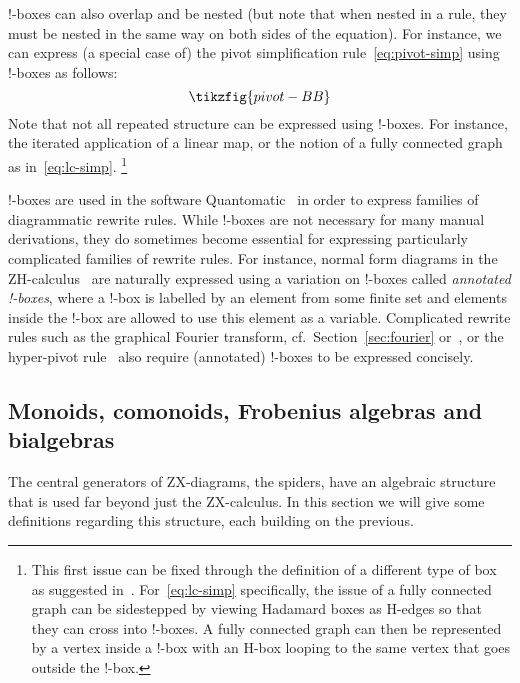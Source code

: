 \documentclass[a4paper,onecolumn,superscriptaddress,11pt,%
				unpublished,%
				allowfontchageintitle,%
				]{quantumarticle}
\begin{document}
!-boxes can also overlap and be nested (but note that when nested in a rule, they must be nested in the same way on both sides of the equation). 
For instance, we can express (a special case of) the pivot simplification rule~\eqref{eq:pivot-simp} using !-boxes as follows:
\begin{equation}
	\tikzfig{pivot-BB}
\end{equation}
Note that not all repeated structure can be expressed using !-boxes. For instance, the iterated application of a linear map, or the notion of a fully connected graph as in~\eqref{eq:lc-simp}.%
\footnote{This first issue can be fixed through the definition of a different type of box as suggested in~\cite{MillerBakewell2020finite}. For~\eqref{eq:lc-simp} specifically, the issue of a fully connected graph can be sidestepped by viewing Hadamard boxes as H-edges so that they can cross into !-boxes. A fully connected graph can then be represented by a vertex inside a !-box with an H-box looping to the same vertex that goes outside the !-box.}

!-boxes are used in the software Quantomatic~\cite{kissinger2015quantomatic} in order to express families of diagrammatic rewrite rules. While !-boxes are not necessary for many manual derivations, they do sometimes become essential for expressing particularly complicated families of rewrite rules. For instance, normal form diagrams in the ZH-calculus~\cite{backens2018zhcalculus} are naturally expressed using a variation on !-boxes called \emph{annotated !-boxes}, where a !-box is labelled by an element from some finite set and elements inside the !-box are allowed to use this element as a variable.
Complicated rewrite rules such as the graphical Fourier transform, cf.~Section~\ref{sec:fourier} or~\cite{GraphicalFourier2019}, or the hyper-pivot rule~\cite{Lemonnier2020hypergraph} also require (annotated) !-boxes to be expressed concisely.


\subsection{Monoids, comonoids, Frobenius algebras and bialgebras}\label{sec:frobenius}

The central generators of ZX-diagrams, the spiders, have an algebraic structure that is used far beyond just the ZX-calculus. In this section we will give some definitions regarding this structure, each building on the previous.
\end{document}

